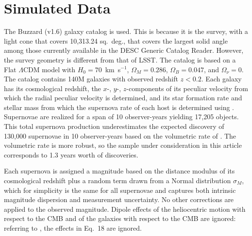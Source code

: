 \documentclass{aastex62}   	%
\begin{document}
\section{Simulated Data}
The Buzzard (v1.6) galaxy catalog is used.  This is because it is the survey, with a light cone that covers 10,313.24 sq.~deg., that covers
the largest solid angle among those currently available
in the DESC Generic Catalog Reader.  However,
the survey geometry is different
from that of LSST.  The catalog is based on a Flat $\Lambda$CDM model with $H_0=70$~km~s$^{-1}$,  $\Omega_M=0.286$, $\Omega_B=0.047$, and
$\Omega_\nu=0$.
The catalog contains 140M galaxies with observed redshift $z<0.2$.
Each galaxy has its cosmological redshift, the $x$-, $y$-, $z$-components of its peculiar velocity from which
the radial peculiar velocity is determined, and its
star formation rate and stellar mass from which the
supernova rate of each host is determined using 
\citet{2012ApJ...755...61S}.  Supernovae are realized for a span of 10 observer-years yielding 17,205 objects.  This total supernova
production underestimates the expected discovery of 130,000 supernovae in 10 observer-years based on the volumetric
rate of \citet{2010ApJ...713.1026D}.  The volumetric rate is more robust, so the sample under consideration in this article
corresponds to 1.3 years worth of discoveries. 

Each supernova is assigned a magnitude based on the distance modulus of its cosmological
redshift plus a random term drawn from a Normal distribution $\sigma_M$, which for simplicity is the same for all supernovae and captures both
intrinsic magnitude dispersion and measurement uncertainty.  No other corrections are applied to the observed magnitude.  Dipole effects of the heliocentric
motion with respect to the CMB and of the galaxies with respect to the CMB  are ignored: referring to
\citet{2011ApJ...741...67D}, the effects in Eq.~18 are ignored.
\end{document}
